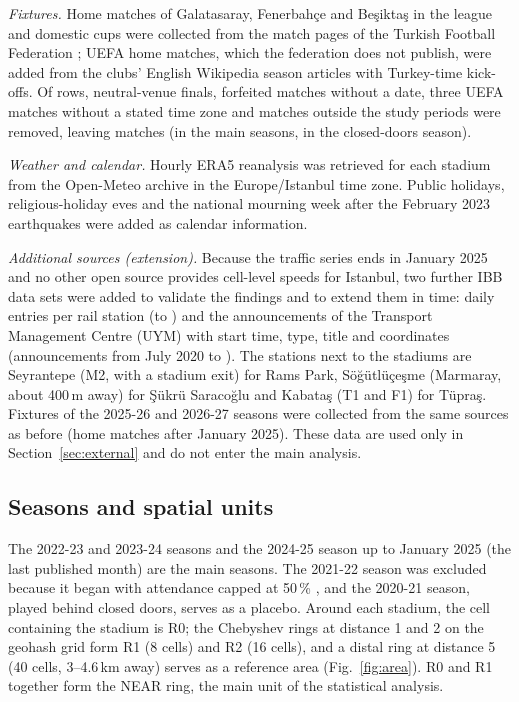 \documentclass[conference]{IEEEtran}
\begin{document}
\textit{Fixtures.} Home matches of Galatasaray, Fenerbahçe and Be\c{s}ikta\c{s} in the league and domestic cups were collected from the match pages of the Turkish Football Federation \cite{tff}; UEFA home matches, which the federation does not publish, were added from the clubs' English Wikipedia season articles \cite{wiki_seasons} with Turkey-time kick-offs. Of \vFixtureRows rows, neutral-venue finals, forfeited matches without a date, three UEFA matches without a stated time zone and matches outside the study periods were removed, leaving \vMatchesTotal matches (\vMatchesMain in the main seasons, \vMatchesClosed in the closed-doors season).

\textit{Weather and calendar.} Hourly ERA5 reanalysis \cite{era5} was retrieved for each stadium from the Open-Meteo archive \cite{openmeteo} in the Europe/Istanbul time zone. Public holidays, religious-holiday eves and the national mourning week after the February 2023 earthquakes were added as calendar information.

\textit{Additional sources (extension).} Because the traffic series ends in January 2025 and no other open source provides cell-level speeds for Istanbul, two further IBB data sets were added to validate the findings and to extend them in time: daily entries per rail station \cite{ibb_rail} (\vExtRailFirst to \vExtRailLast) and the announcements of the Transport Management Centre (UYM) with start time, type, title and coordinates \cite{ibb_uym} (\vExtUymRows announcements from July 2020 to \vExtUymLast). The stations next to the stadiums are Seyrantepe (M2, with a stadium exit) for Rams Park, Sö\u{g}ütlüçe\c{s}me (Marmaray, about 400\,m away) for \c{S}ükrü Saraco\u{g}lu and Kabata\c{s} (T1 and F1) for Tüpra\c{s}. Fixtures of the 2025-26 and 2026-27 seasons were collected from the same sources as before (\vExtFixAfter home matches after January 2025). These data are used only in Section~\ref{sec:external} and do not enter the main analysis.

\subsection{Seasons and spatial units}
The 2022-23 and 2023-24 seasons and the 2024-25 season up to January 2025 (the last published month) are the main seasons. The 2021-22 season was excluded because it began with attendance capped at 50\,\% \cite{karar2021}, and the 2020-21 season, played behind closed doors, serves as a placebo. Around each stadium, the cell containing the stadium is R0; the Chebyshev rings at distance 1 and 2 on the geohash grid form R1 (8 cells) and R2 (16 cells), and a distal ring at distance 5 (40 cells, 3--4.6\,km away) serves as a reference area (Fig.~\ref{fig:area}). R0 and R1 together form the NEAR ring, the main unit of the statistical analysis.
\end{document}
